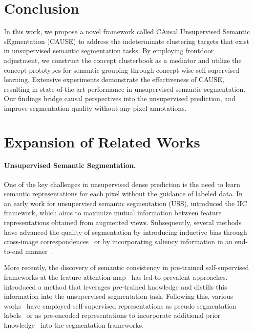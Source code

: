 \documentclass{article} \usepackage{iclr2024_conference,times}
\begin{document}
\section{Conclusion}
\label{sec:4}
In this work, we propose a novel framework called CAusal Unsupervised Semantic sEgmentation (CAUSE) to address the indeterminate clustering targets that exist in unsupervised semantic segmentation tasks. By employing frontdoor adjustment, we construct the concept clusterbook as a mediator and utilize the concept prototypes for semantic grouping through concept-wise self-supervised learning. Extensive experiments demonstrate the effectiveness of CAUSE, resulting in state-of-the-art performance in unsupervised semantic segmentation. Our findings bridge causal perspectives into the unsupervised prediction, and improve segmentation quality without any pixel annotations.






\appendix
\section{Expansion of Related Works}
\label{appendix:A}

\paragraph{Unsupervised Semantic Segmentation.} 
One of the key challenges in unsupervised dense prediction is the need to learn semantic representations for each pixel without the guidance of labeled data. In an early work for unsupervised semantic segmentation (USS), \citet{ji2019invariant} introduced the IIC framework, which aims to maximize mutual information between feature representations obtained from augmented views. Subsequently, several methods have advanced the quality of segmentation by introducing inductive bias through cross-image correspondences~\citep{hwang2019segsort, cho2021picie, wen2022selfsupervised} or by incorporating saliency information in an end-to-end manner~\citep{van2021unsupervised, ke2022unsupervised}.

More recently, the discovery of semantic consistency in pre-trained self-supervised frameworks at the feature attention map~\citep{caron2021emerging} has led to prevalent approaches. \citet{hamilton2022unsupervised} introduced a method that leverages pre-trained knowledge and distills this information into the unsupervised segmentation task. Following this, various works~\citep{wen2022selfsupervised, yin2022transfgu, ziegler2022self} have employed self-supervised representations as pseudo segmentation labels~\citep{zadaianchuk2023unsupervised, liacseg} or as pre-encoded representations to incorporate additional prior knowledge~\citep{van2021unsupervised, zadaianchuk2023unsupervised} into the segmentation frameworks.
\end{document}
